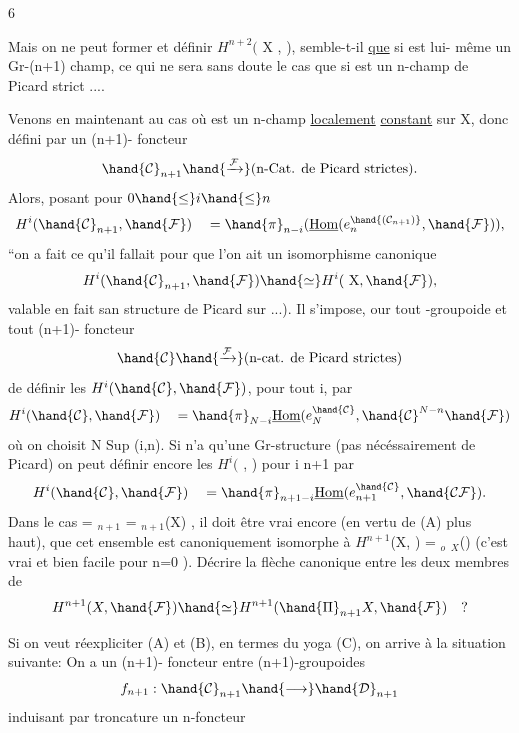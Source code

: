  \hfill 6

Mais on ne peut former  et définir $H^{n+2}($ X ,  ), semble-t-il
\uline{que} si  est lui- même un Gr-(n+1) champ, ce qui ne sera sans
doute le cas que si  est un n-champ de Picard strict ....

Venons en maintenant au cas où  est un n-champ \uline{localement}
\uline{constant} sur X, donc défini par un (n+1)- foncteur
\[ \hand{\mathcal{C}}_{n+1} \hand{\xrightarrow{\mathcal{F}}} \text{(n-Cat. de Picard strictes).} \]
Alors, posant pour $0 \hand{\leq} i \hand{\leq} n$
\[ H^i(\hand{\mathcal{C}}_{n+1}, \hand{\mathcal{F}}) \quad = \hand{\pi}_{n-i} (\underline{\text{Hom}} (e_n^{\hand{(\mathcal{C}_{n+1})}}, \hand{\mathcal{F}})), \]
``on a fait ce qu'il fallait pour que l'on ait un isomorphisme canonique
\[ H^i(\hand{\mathcal{C}}_{n+1}, \hand{\mathcal{F}}) \hand{\simeq} H^i(\text{ X}, \hand{\mathcal{F}} ), \]
\hand{(}valable en fait san structure de Picard sur  ...). Il s'impose, our
tout \hand{$\infty$} -groupoide  et tout (n+1)- foncteur
\[ \hand{\mathcal{C}} \hand{\xrightarrow{\mathcal{F}}} \text{(n-cat. de Picard strictes)} \]
de définir les $H^i(\hand{\mathcal{C}}, \hand{\mathcal{F}})$, pour tout i, par
\[ H^i(\hand{\mathcal{C}},\hand{\mathcal{F}}) \quad = \hand{\pi}_{N-i} \underline{\text{Hom}} (e_N^{\hand{\mathcal{C}}} ,\hand{\mathcal{C}}^{N-n} \hand{\mathcal{F}}) \]
où on choisit N \hand{$\geq$}Sup (i,n). Si  n'a qu'une Gr-structure (pas
nécéssairement de Picard) on peut définir encore les $H^i($ ,  ) pour
i \hand{$\leq$} n+1 par
\[ H^i(\hand{\mathcal{C}}, \hand{\mathcal{F}} ) \quad = \hand{\pi}_{n+1-i} \underline{\text{Hom}} ( e_{n+1}^{\hand{\mathcal{C}}} , \hand{\mathcal{C}\mathcal{F}}). \]
Dans le cas  = $_{n+1}$ = \hand{$\Pi$}$_{n+1}$(X) , il doit être vrai encore
(en vertu de (A) plus haut), que cet ensemble est canoniquement isomorphe
à $H^{n+1}$(X, ) = \hand{$\pi$}$_o$ \hand{$\Gamma$}$_X$() (c'est vrai et bien facile pour n=0 ).
Décrire la flèche canonique entre les deux membres de
\[ H^{n+1}(X , \hand{\mathcal{F}}) \hand{\simeq} H^{n+1}(\hand{\Pi}_{n+1}X, \hand{\mathcal{F}}) \quad ? \]

Si on veut réexpliciter (A) et (B), en termes du yoga (C), on arrive
à la situation suivante:
On a un (n+1)- foncteur entre (n+1)-groupoides
\[ f_{n+1} : \hand{\mathcal{C}}_{n+1} \hand{\longrightarrow} \hand{\mathcal{D}}_{n+1} \]
induisant par troncature un n-foncteur

